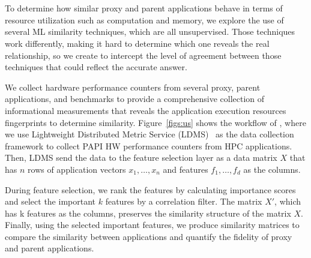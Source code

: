 \section{\us}
\label{sec:simEngine}
To determine how similar proxy and parent applications behave in terms of resource utilization such as computation and memory, we explore the use of several ML similarity techniques, which are all unsupervised. Those techniques work differently, making it hard to determine which one reveals the real relationship, so we create \us to intercept the level of agreement between those techniques that could reflect the accurate answer. 

We collect hardware performance counters from several proxy, parent applications, and benchmarks to provide a comprehensive collection of informational measurements that reveals the application execution resources fingerprints to determine similarity.  
Figure~\ref{figs:us} shows the workflow of \us, where we use Lightweight Distributed Metric Service (LDMS)~\cite{ldms_sandia} as the data collection framework to collect PAPI HW performance counters from HPC applications. Then, LDMS send the data to the feature selection layer as a data matrix $X$ that has $n$ rows of application vectors $x_{1},\ldots,x_{n}$ and features $f_{1},\ldots,f_{d}$ as the columns.


During feature selection, we rank the features by calculating importance scores and select the important $k$ features by a correlation filter.
The matrix $X'$, which has k features as the columns, preserves the similarity structure of the matrix $X$. 
Finally, using the selected important features, we produce similarity matrices to compare the similarity between applications and quantify the fidelity of proxy and parent applications. 

